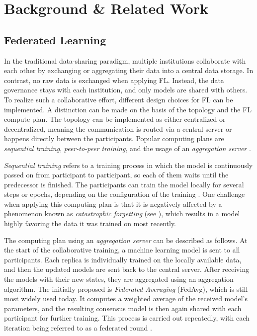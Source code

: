 \section{Background \& Related Work}
\label{sec:RelatedWork}

\subsection{Federated Learning}
\label{subsec:FederatedLearning}

In the traditional data-sharing paradigm, multiple institutions collaborate with each other by exchanging or aggregating their data into a central data storage. In contrast, no raw data is exchanged when applying FL. Instead, the data governance stays with each institution, and only models are shared with others.
To realize such a collaborative effort, different design choices for FL can be implemented. A distinction can be made on the basis of the topology and the FL compute plan. The topology can be implemented as either centralized or decentralized, meaning the communication is routed via a central server or happens directly between the participants. Popular computing plans are \textit{sequential training}, \textit{peer-to-peer training}, and the usage of an \textit{aggregation server} \citep{Rieke2020TheLearning}.

\textit{Sequential training} refers to a training process in which the model is continuously passed on from participant to participant, so each of them waits until the predecessor is finished. The participants can train the model locally for several steps or epochs, depending on the configuration of the training \citep{Chang2018DistributedImaging}. One challenge when applying this computing plan is that it is negatively affected by a phenomenon known as \textit{catastrophic forgetting} (see \cite{French1999CatastrophicNetworks}), which results in a model highly favoring the data it was trained on most recently.

The computing plan using an \textit{aggregation server} can be described as follows. At the start of the collaborative training, a machine learning model is sent to all participants. Each replica is individually trained on the locally available data, and then the updated models are sent back to the central server. After receiving the models with their new states, they are aggregated using an aggregation algorithm. The initially proposed is \textit{Federated Averaging} (FedAvg), which is still most widely used today. It computes a weighted average of the received model's parameters, and the resulting consensus model is then again shared with each participant for further training. This process is carried out repeatedly, with each iteration being referred to as a federated round \citep{BrendanMcMahan2017}.

